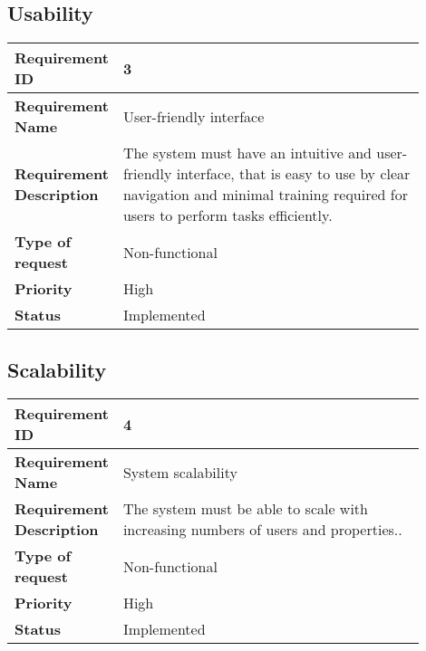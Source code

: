 \subsection{Usability}
\begin{table}[htbp]
  \centering
\begin{tabular}{|m{0.15\linewidth}|m{0.75\linewidth}|}
    \hline
    \textbf{Requirement ID} & 3 \\
    \hline
    \textbf{Requirement Name} & User-friendly interface \\
    \hline
    \textbf{Requirement Description} & The system must have an intuitive and user-friendly interface, that is easy to use by clear navigation and minimal training required for users to perform tasks efficiently. \\
    \hline
    \textbf{Type of request} & Non-functional \\
    \hline
    \textbf{Priority} & High \\
    \hline
    \textbf{Status} & Implemented \\
    \hline
  \end{tabular}
\end{table}

\newpage
\subsection{Scalability}
\begin{table}[htbp]
  \centering
\begin{tabular}{|m{0.15\linewidth}|m{0.75\linewidth}|}
    \hline
    \textbf{Requirement ID} & 4 \\
    \hline
    \textbf{Requirement Name} & System scalability \\
    \hline
    \textbf{Requirement Description} & The system must be able to scale with increasing numbers of users and properties.. \\
    \hline
    \textbf{Type of request} & Non-functional \\
    \hline
    \textbf{Priority} & High \\
    \hline
    \textbf{Status} & Implemented \\
    \hline
  \end{tabular}
\end{table}

